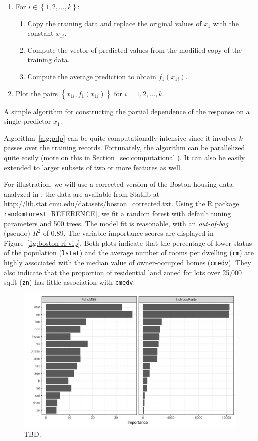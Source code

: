 \documentclass{article}
\def\code#1{\texttt{#1}}
\begin{document}
\begin{algorithm}
\begin{enumerate}
  \item For $i \in \left\{1, 2, \dots, k\right\}$:
  \begin{enumerate}
    \item Copy the training data and replace the original values of $x_1$ with the constant $x_{1i}$.
    \item Compute the vector of predicted values from the modified copy of the training data.
    \item Compute the average prediction to obtain $\bar{f}_1\left(x_{1i}\right)$.
  \end{enumerate}
  \item Plot the pairs $\left\{x_{1i}, \bar{f}_1\left(x_{1i}\right)\right\}$ for $i = 1, 2, \dotsc, k$.
\end{enumerate}
\caption{A simple algorithm for constructing the partial dependence of the response on a single predictor $x_1$. \label{alg:pdp}}
\end{algorithm}
Algorithm~\ref{alg:pdp} can be quite computationally intensive since it involves $k$ passes over the training records. Fortunately, the algorithm can be parallelized quite easily (more on this in Section~\ref{sec:computational}). It can also be easily extended to larger subsets of two or more features as well.

For illustration, we will use a corrected version of the Boston housing data analyzed in \citet{harrison-1978-hedonic}; the data are available from Statlib at \url{http://lib.stat.cmu.edu/datasets/boston_corrected.txt}. Using the R package \texttt{randomForest} [REFERENCE], we fit a random forest with default tuning parameters and 500 trees. The model fit is reasonable, with an \textit{out-of-bag} (pseudo) $R^2$ of 0.89. The variable importance scores are displayed in Figure~\ref{fig:boston-rf-vip}. Both plots indicate that the percentage of lower status of the population (\code{lstat}) and the average number of rooms per dwelling (\code{rm}) are highly associated with the median value of owner-occupied homes (\code{cmedv}). They also indicate that the proportion of residential land zoned for lots over 25,000 sq.ft (\code{zn}) has little association with \code{cmedv}.
\begin{figure}[!htb]
  \label{boston-rf-vip}
  \centering
  \includegraphics[width=1.0\textwidth]{boston-rf-vip}
  \caption{TBD.}
\end{figure}
\end{document}
